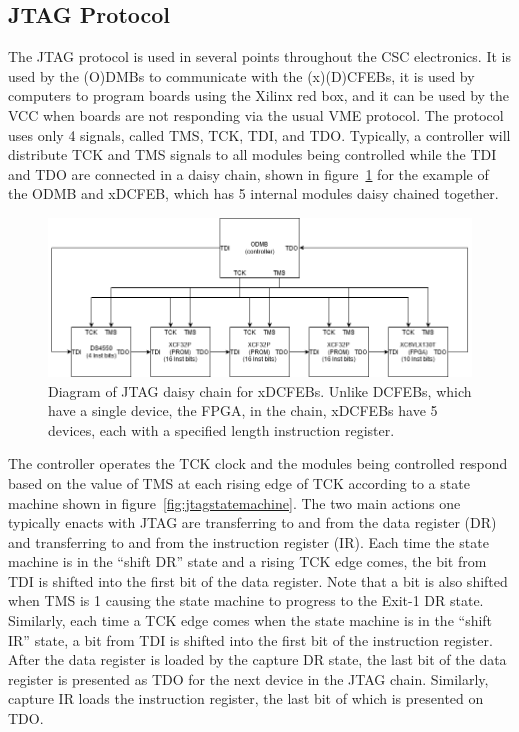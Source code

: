 \documentclass[10pt,a4paper]{article}
\begin{document}
\subsection{JTAG Protocol}

The JTAG protocol is used in several points throughout the CSC electronics. It is used by the (O)DMBs to communicate with the (x)(D)CFEBs, it is used by computers to program boards using the Xilinx red box, and it can be used by the VCC when boards are not responding via the usual VME protocol. The protocol uses only 4 signals, called TMS, TCK, TDI, and TDO. Typically, a controller will distribute TCK and TMS signals to all modules being controlled while the TDI and TDO are connected in a daisy chain, shown in figure~\ref{fig:jtagdaisychain} for the example of the ODMB and xDCFEB, which has 5 internal modules daisy chained together.

\begin{figure}[H]
\centering
\includegraphics[width= 0.75 \textwidth]{figures/jtagdaisychain.png}
\caption{Diagram of JTAG daisy chain for xDCFEBs. Unlike DCFEBs, which have a single device, the FPGA, in the chain, xDCFEBs have 5 devices, each with a specified length instruction register.}
\label{fig:jtagdaisychain}
\end{figure}

The controller operates the TCK clock and the modules being controlled respond based on the value of TMS at each rising edge of TCK according to a state machine shown in figure~\ref{fig:jtagstatemachine}. The two main actions one typically enacts with JTAG are transferring to and from the data register (DR) and transferring to and from the instruction register (IR). Each time the state machine is in the ``shift DR'' state and a rising TCK edge comes, the bit from TDI is shifted into the first bit of the data register. Note that a bit is also shifted when TMS is 1 causing the state machine to progress to the Exit-1 DR state. Similarly, each time a TCK edge comes when the state machine is in the ``shift IR'' state, a bit from TDI is shifted into the first bit of the instruction register. After the data register is loaded by the capture DR state, the last bit of the data register is presented as TDO for the next device in the JTAG chain. Similarly, capture IR loads the instruction register, the last bit of which is presented on TDO.
\end{document}

